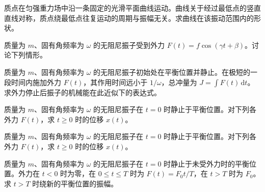 \noindent\begin{minipage}{\textwidth}
质点在匀强重力场中沿一条固定的光滑平面曲线运动。曲线关于经过最低点的竖直直线对称，质点绕最低点往复运动的周期与振幅无关。求曲线在该振动范围内的形状。
\end{minipage}\par\vfill
\newpage
\noindent\begin{minipage}{\textwidth}
质量为 $m$、固有角频率为 $\omega$ 的无阻尼振子受到外力 $F(t)=f\cos(\gamma t+\beta)$。讨论下列情形。
\end{minipage}\par\vfill
\noindent\begin{minipage}{\textwidth}
质量为 $m$、固有角频率为 $\omega$ 的无阻尼振子初始处在平衡位置并静止。在极短的一段时间内施加外力 $F(t)$，其作用时间远小于 $1/\omega$，总冲量为 $J=\int F(t)\,\mathrm{d}t$。求外力停止后振子的机械能在此近似下的表达式。
\end{minipage}\par\vfill
\newpage
\noindent\begin{minipage}{\textwidth}
质量为 $m$、固有角频率为 $\omega$ 的无阻尼振子在 $t=0$ 时静止于平衡位置。对下列各外力 $F(t)$，求 $t\ge0$ 时的位移 $x(t)$。
\end{minipage}\par\vfill
\noindent\begin{minipage}{\textwidth}
质量为 $m$、固有角频率为 $\omega$ 的无阻尼振子在 $t=0$ 时静止于平衡位置。对下列各外力 $F(t)$，求 $t\ge0$ 时的位移 $x(t)$。
\end{minipage}\par\vfill
\newpage
\noindent\begin{minipage}{\textwidth}
质量为 $m$、固有角频率为 $\omega$ 的无阻尼振子在 $t=0$ 时静止于未受外力时的平衡位置。外力在 $t<0$ 时为零，在 $0\le t\le T$ 时为 $F(t)=F_0t/T$，在 $t>T$ 时为 $F_0$。求 $t>T$ 时绕新的平衡位置的振幅。
\end{minipage}\par\vfill
